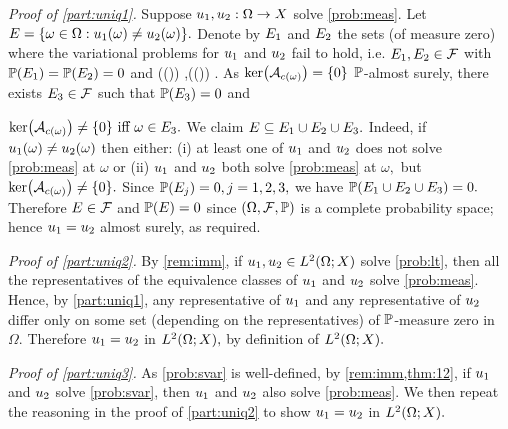 \emph{Proof of \cref{part:uniq1}.} Suppose $u_{1},u_{2}:\Omega\rightarrow X$ solve \cref{prob:meas}. Let $E = \set{\omega \in \Omega \st \uo(\omega) \neq \ut(\omega)}.$ Denote by $E_{1}$ and $E_{2}$ the sets (of measure zero) where the variational problems for $u_{1}$ and $u_{2}$ fail to hold, i.e. $E_{1},E_{2} \in \mathcal F$ with $\mathbb P(E_{1})=\mathbb P(E_{2})=0$ and %
\beqs
\Acomega\mleft(\uo(\omega)\mright) \neq \Lcomega \tiff \omega \in \Eo,\quad{}\quad \Acomega\mleft(\ut(\omega)\mright) \neq \Lcomega \tiff \omega \in \Et.
\eeqs As  $\ker\mleft(\Acomega\mright) = \set{0}$ $\mathbb P$-almost surely, there exists $E_{3} \in \mathcal F$ such that $\mathbb P(E_{3}) = 0$ and

\noindent $\ker\mleft(\Acomega\mright) \neq \set{0} \tiff \omega \in \Eth.$
We claim $E \subseteq E_{1}\cup E_{2}\cup E_{3}.$ Indeed, if $u_{1}(\omega) \neq u_{2}(\omega)$ then either: (i) at least one of $u_{1}$ and $u_{2}$ does not solve \cref{prob:meas} at $\omega$ or (ii) $u_{1}$ and $u_{2}$ both solve \cref{prob:meas} at $\omega,$ but $\ker\mleft(\Acomega\mright) \neq \set{0}.$
Since $\mathbb P(E_j)=0, j = 1,2,3,$ we have $\mathbb P(E_{1}\cup E_{2}\cup E_{3}) = 0.$  Therefore $E \in \mathcal F$ and $\mathbb P(E)=0$ since $\OFP$ is a complete probability space; hence $u_{1} = u_{2}$ almost surely, as required.

\emph{Proof of \cref{part:uniq2}.} By \cref{rem:imm}, if $\uo,\ut \in \LtOX$ solve \cref{prob:lt}, then all the representatives of the equivalence classes of $u_{1}$ and $u_{2}$ solve \cref{prob:meas}. Hence, by \cref{part:uniq1}, any representative of $u_{1}$ and any representative of $u_{2}$ differ only on some set (depending on the representatives) of $\mathbb P$-measure zero in $\Omega.$ Therefore $u_{1}=u_{2}$ in $\LtOX,$ by definition of $\LtOX.$

\emph{Proof of \cref{part:uniq3}.} As \cref{prob:svar} is well-defined, by \cref{rem:imm,thm:12}, if $u_{1}$ and $u_{2}$ solve \cref{prob:svar}, then $u_{1}$ and $u_{2}$ also solve \cref{prob:meas}. We then repeat the reasoning in the proof of \cref{part:uniq2} to show $u_{1}=u_{2}$ in $\LtOX.$
\epf
